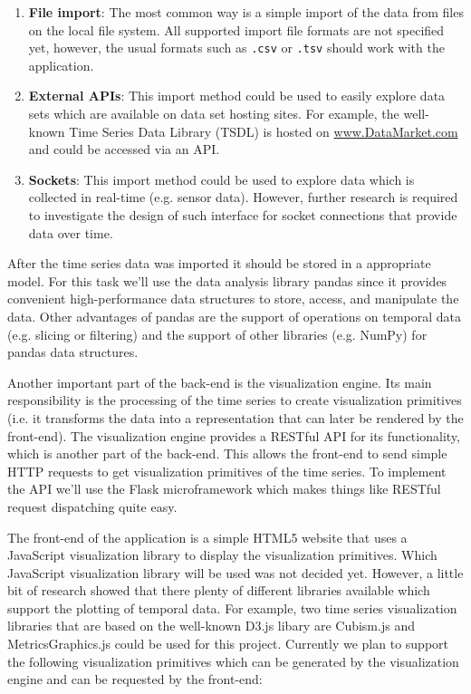 \documentclass[12pt, a4paper]{article}
\begin{document}
\begin{enumerate}
 \item \textbf{File import}: The most common way is a simple import of the data from files on the local file system.
 All supported import file formats are not specified yet, however, the usual formats such as \texttt{.csv} or \texttt{.tsv} should work with the application.
 \item \textbf{External APIs}: This import method could be used to easily explore data sets which are available on data set hosting sites. 
 For example, the well-known Time Series Data Library (TSDL) is hosted on \url{www.DataMarket.com} and could be accessed via an API. 
 \item \textbf{Sockets}: This import method could be used to explore data which is collected in real-time (e.g. sensor data). 
 However, further research is required to investigate the design of such interface for socket connections that provide data over time.
\end{enumerate}

After the time series data was imported it should be stored in a appropriate model. 
For this task we'll use the data analysis library pandas since it provides convenient high-performance data structures to store, access, and manipulate the data.
Other advantages of pandas are the support of operations on temporal data (e.g. slicing or filtering) and the support of other libraries (e.g. NumPy) for pandas data structures.

Another important part of the back-end is the visualization engine. 
Its main responsibility is the processing of the time series to create visualization primitives (i.e. it transforms the data into a representation that can later be rendered by the front-end).
The visualization engine provides a RESTful API for its functionality, which is another part of the back-end.
This allows the front-end to send simple HTTP requests to get visualization primitives of the time series.
To implement the API we'll use the Flask microframework which makes things like RESTful request dispatching quite easy.

The front-end of the application is a simple HTML5 website that uses a JavaScript visualization library to display the visualization primitives.
Which JavaScript visualization library will be used was not decided yet.
However, a little bit of research showed that there plenty of different libraries available which support the plotting of temporal data.
For example, two time series visualization libraries that are based on the well-known D3.js libary are Cubism.js and MetricsGraphics.js could be used for this project.
Currently we plan to support the following visualization primitives which can be generated by the visualization engine and can be requested by the front-end:
\end{document}
